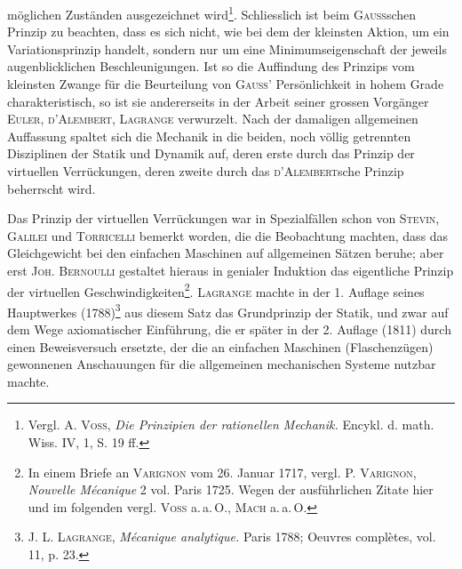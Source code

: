möglichen Zuständen ausgezeichnet wird\footnote{Vergl. A. \textsc{Voss}, \textit{Die Prinzipien der rationellen Mechanik.} Encykl. d. math. Wiss. IV, 1, S. 19 ff.}. Schliesslich ist beim \textsc{Gauss}schen
Prinzip zu beachten, dass es sich nicht, wie bei dem der kleinsten Aktion, um
ein Variationsprinzip handelt, sondern nur um eine Minimumseigenschaft der
jeweils augenblicklichen Beschleunigungen.
\clearpage{}
\HistoricalFoot{}{3\textsuperscript{*}}
Ist so die Auffindung des Prinzips vom kleinsten Zwange für die Beurteilung
von \textsc{Gauss}’ Persönlichkeit in hohem Grade charakteristisch, so ist
sie andererseits in der Arbeit seiner grossen Vorgänger \textsc{Euler}, \textsc{d’Alembert},
\textsc{Lagrange} verwurzelt. Nach der damaligen allgemeinen Auffassung spaltet sich
die Mechanik in die beiden, noch völlig getrennten Disziplinen der Statik
und Dynamik auf, deren erste durch das Prinzip der virtuellen Verrückungen,
deren zweite durch das \textsc{d’Alembert}sche Prinzip beherrscht wird.

Das Prinzip der virtuellen Verrückungen war in Spezialfällen schon von
\textsc{Stevin}, \textsc{Galilei} und \textsc{Torricelli} bemerkt worden, die die Beobachtung machten,
dass das Gleichgewicht bei den einfachen Maschinen auf allgemeinen Sätzen
beruhe; aber erst \textsc{Joh. Bernoulli} gestaltet hieraus in genialer Induktion das
eigentliche Prinzip der virtuellen Geschwindigkeiten\footnote{In einem Briefe an \textsc{Varignon} vom 26. Januar 1717, vergl. P. \textsc{Varignon}, \textit{Nouvelle Mécanique}
2 vol. Paris 1725. Wegen der ausführlichen Zitate hier und im folgenden vergl. \textsc{Voss} a.\,a.\,O., \textsc{Mach} a.\,a.\,O.}. \textsc{Lagrange} machte in
der 1. Auflage seines Hauptwerkes (1788)\footnote{J. L. \textsc{Lagrange}, \textit{Mécanique analytique.} Paris 1788; Oeuvres complètes, vol. 11, p. 23.} aus diesem Satz das Grundprinzip
der Statik, und zwar auf dem Wege axiomatischer Einführung, die er später
in der 2. Auflage (1811) durch einen Beweisversuch ersetzte, der die an einfachen
Maschinen (Flaschenzügen) gewonnenen Anschauungen für die allgemeinen
mechanischen Systeme nutzbar machte.

